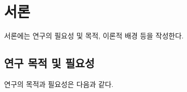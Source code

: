\section{서론}
서론에는 연구의 필요성 및 목적, 이론적 배경 등을 작성한다.

\subsection{연구 목적 및 필요성}
연구의 목적과 필요성은 다음과 같다.\cite{True2000}